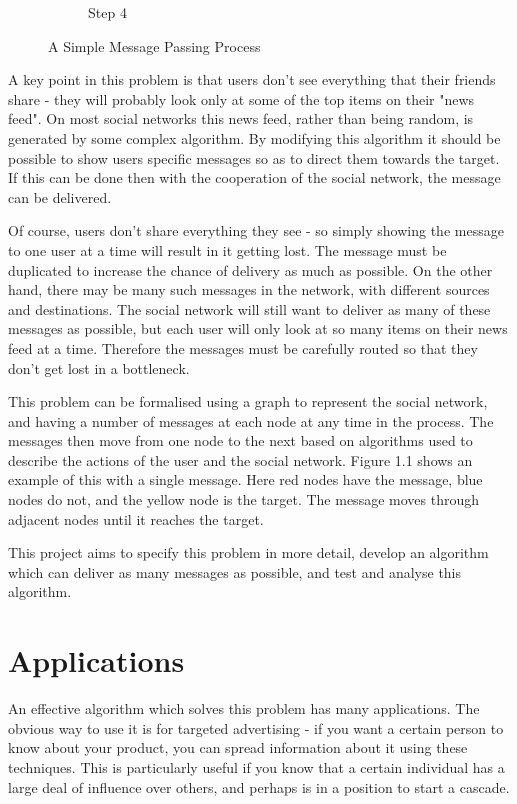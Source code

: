 \documentclass[bsc,frontabs,twoside,singlespacing,parskip,deptreport]{infthesis}     %
\begin{document}
\begin{figure}
\begin{subfigure}[b]{0.18\textwidth}
        \caption{Step 4}
        \label{fig:simpleProcess4}
    \end{subfigure}
  	\vspace{-5pt}
    \caption{A Simple Message Passing Process}\label{fig:simpleProcess}
  	\vspace{-15pt}
\end{figure}

A key point in this problem is that users don't see everything that their friends share - they will probably look only at some of the top items on their "news feed". On most social networks this news feed, rather than being random, is generated by some complex algorithm. By modifying this algorithm it should be possible to show users specific messages so as to direct them towards the target. If this can be done then with the cooperation of the social network, the message can be delivered.

Of course, users don't share everything they see - so simply showing the message to one user at a time will result in it getting lost. The message must be duplicated to increase the chance of delivery as much as possible. On the other hand, there may be many such messages in the network, with different sources and destinations. The social network will still want to deliver as many of these messages as possible, but each user will only look at so many items on their news feed at a time. Therefore the messages must be carefully routed so that they don't get lost in a bottleneck.

This problem can be formalised using a graph to represent the social network, and having a number of messages at each node at any time in the process. The messages then move from one node to the next based on algorithms used to describe the actions of the user and the social network. Figure 1.1 shows an example of this with a single message. Here red nodes have the message, blue nodes do not, and the yellow node is the target. The message moves through adjacent nodes until it reaches the target.

This project aims to specify this problem in more detail, develop an algorithm which can deliver as many messages as possible, and test and analyse this algorithm.

\section{Applications}
An effective algorithm which solves this problem has many applications. The obvious way to use it is for targeted advertising - if you want a certain person to know about your product, you can spread information about it using these techniques. This is particularly useful if you know that a certain individual has a large deal of influence over others, and perhaps is in a position to start a cascade.
\end{document}
